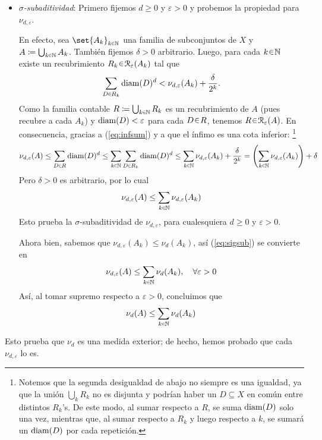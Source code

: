 \begin{sol}
\begin{enumerate}[label = (\roman*), leftmargin=1.5em]
\begin{itemize}[leftmargin=1em]
    \item\emph{$\sigma$-subaditividad}: Primero fijemos $d\ge 0$ y $\varepsilon>0$ y probemos la propiedad para $\nu_{d,\varepsilon}$.\par
    En efecto, sea $\set{A_k}_{k\en\mathbb{N}}$ una familia de subconjuntos de $X$ y $A\coloneq\bigcup_{k\en\mathbb{N}} A_k$.
    También fijemos $\delta>0$ arbitrario. Luego, para cada $k\en\mathbb{N}$ existe un recubrimiento $R_k \en \mathcal{R}_{\varepsilon}(A_k)$ tal que
    \begin{equation}\label{eq:infsum}
    \sum_{D\en R_{k}} \diam(D)^d
    < \nu_{d,\varepsilon}(A_k)+\frac{\delta}{2^k}.
    \end{equation}
    Como la familia contable $R\coloneq\bigcup_{k\en\mathbb{N}} R_k$ es un recubrimiento de $A$ (pues recubre a cada $A_k$) y $\operatorname{diam}(D) < \varepsilon$ para cada $D\en R$, tenemos $R \en \mathcal{R}_\varepsilon(A)$. En consecuencia, gracias a (\ref{eq:infsum}) y a que el ínfimo es una cota inferior:%
    \footnote{
        Notemos que la segunda desigualdad de abajo no siempre es una igualdad, ya que la unión $\bigcup_kR_k$ no es disjunta y podrían haber un $D\subseteq X$ en común entre distintos $R_k$'s. De este modo, al sumar respecto a $R$, se suma $\operatorname{diam}(D)$ solo una vez, mientras que, al sumar respecto a $R_k$ y luego respecto a $k$, se sumará un $\operatorname{diam}(D)$ por cada repetición.
    }
    \[
    \nu_{d,\varepsilon}(A)%
    \le \sum_{D\en R} \diam(D)^d%
    \le \sum_{k\en\mathbb{N}} \sum_{D\en R_{k}} \diam(D)^d
    \le \sum_{k\en\mathbb{N}} \nu_{d,\varepsilon}(A_k)+\frac{\delta}{2^k}
    = \left(\sum_{k\en\mathbb{N}} \nu_{d,\varepsilon}(A_k)\right)+\delta
    \]
    Pero $\delta>0$ es arbitrario, por lo cual
    \begin{equation}\label{eq:sigsub}
    \nu_{d,\varepsilon}(A) \le \sum_{k\en\mathbb{N}} \nu_{d,\varepsilon}(A_k)
    \end{equation}
    Esto prueba la $\sigma$-subaditividad de $\nu_{d,\varepsilon}$, para cualesquiera $d \ge 0$ y $\varepsilon>0$.\par
    Ahora bien, sabemos que $\nu_{d,\varepsilon}(A_k) \leq \nu_d(A_k)$, así (\ref{eq:sigsub}) se convierte en
    \[
    \nu_{d,\varepsilon}(A) \le \sum_{k\en\mathbb{N}} \nu_{d}(A_k),
    \quad\forall\varepsilon>0
    \]
    Así, al tomar supremo respecto a $\varepsilon>0$, concluimos que
    \[
    \nu_{d}(A) \le \sum_{k\en\mathbb{N}} \nu_{d}(A_k)
    \]
\end{itemize}
Esto prueba que $\nu_d$ es una medida exterior; de hecho, hemos probado que cada $\nu_{d,\varepsilon}$ lo es.

\end{enumerate}
\end{sol}
